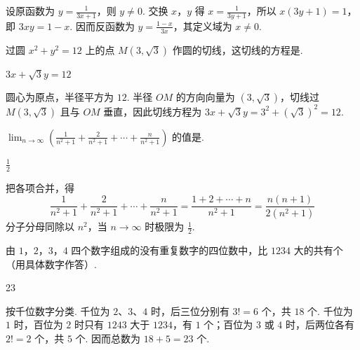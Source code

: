 \begin{solution}
设原函数为 \(y=\frac1{3x+1}\)，则 \(y\neq0\). 交换 \(x\)，\(y\) 得 \(x=\frac1{3y+1}\)，所以 \(x(3y+1)=1\)，即 \(3xy=1-x\). 因而反函数为 \(y=\frac{1-x}{3x}\)，其定义域为 \(x\neq0\).
\end{solution}

\begin{problem}

过圆 \(x^2 + y^2 = 12\) 上的点 \(M(3,\sqrt{3})\) 作圆的切线，这切线的方程是\fillinblank{}.
\end{problem}

\begin{answer}
\(3x + \sqrt{3}y = 12\)
\end{answer}

\begin{solution}
圆心为原点，半径平方为 \(12\). 半径 \(OM\) 的方向向量为 \((3,\sqrt3)\)，切线过 \(M(3,\sqrt3)\) 且与 \(OM\) 垂直，因此切线方程为 \(3x+\sqrt3y=3^2+(\sqrt3)^2=12\).
\end{solution}

\begin{problem}

\(\displaystyle\lim_{n \to \infty}\left(\frac{1}{n^2 + 1} + \frac{2}{n^2 + 1} + \cdots + \frac{n}{n^2 + 1}\right)\) 的值是\fillinblank{}.
\end{problem}

\begin{answer}
\(\frac{1}{2}\)
\end{answer}

\begin{solution}
把各项合并，得
\[
\frac{1}{n^2+1}+\frac{2}{n^2+1}+\cdots+\frac{n}{n^2+1}=\frac{1+2+\cdots+n}{n^2+1}=\frac{n(n+1)}{2(n^2+1)}
\]
分子分母同除以 \(n^2\)，当 \(n\to\infty\) 时极限为 \(\frac12\).
\end{solution}

\begin{problem}

由 \(1\)，\(2\)，\(3\)，\(4\) 四个数字组成的没有重复数字的四位数中，比 \(1234\) 大的共有\fillinblank{}个（用具体数字作答）.
\end{problem}

\begin{answer}
23
\end{answer}

\begin{solution}
按千位数字分类. 千位为 \(2\)、\(3\)、\(4\) 时，后三位分别有 \(3!=6\) 个，共 \(18\) 个. 千位为 \(1\) 时，百位为 \(2\) 时只有 \(1243\) 大于 \(1234\)，有 \(1\) 个；百位为 \(3\) 或 \(4\) 时，后两位各有 \(2!=2\) 个，共 \(5\) 个. 因而总数为 \(18+5=23\) 个.
\end{solution}

